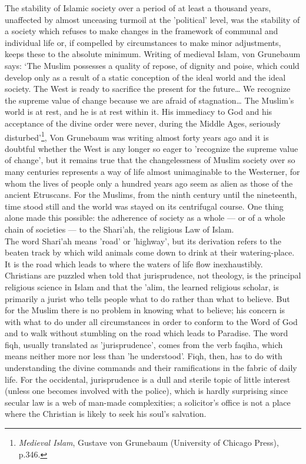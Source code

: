 \documentclass[10pt, twoside,openright]{book}
\begin{document}
The stability of Islamic society over a period of at least a thousand years, unaffected by almost 
unceasing turmoil at the 'political' level, was the stability of a society which refuses to make 
changes in the framework of communal and individual life or, if compelled by circumstances to make 
minor adjustments, keeps these to the absolute minimum. Writing of medieval Islam, von Grunebaum 
says: `The Muslim possesses a quality of repose, of dignity and poise, which could develop only as a 
result of a static conception of the ideal world and the ideal society. The West is ready to 
sacrifice the present for the future\ldots{} We recognize the supreme value of change because we are 
afraid of stagnation\ldots{} The Muslim's world is at rest, and he is at rest within it. His immediacy to 
God and his acceptance of the divine order were never, during the Middle Ages, seriously 
disturbed'\footnote{\emph{Medieval Islam}, Gustave von Grunebaum (University of Chicago Press), p.346.}, Von Grunebaum was writing almost forty years ago and it is doubtful whether the West 
is any longer so eager to 'recognize the supreme value of change', but it remains true that the 
changelessness of Muslim society over so many centuries represents a way of life almost unimaginable 
to the Westerner, for whom the lives of people only a hundred years ago seem as alien as those of the 
ancient Etruscans. For the Muslims, from the ninth century until the nineteenth, time stood still and 
the world was stayed on its centrifugal course. One thing alone made this possible: the adherence of 
society as a whole --- or of a whole chain of societies --- to the Shari'ah, the religious Law of Islam. \\

The word Shari'ah means 'road' or 'highway', but its derivation refers to the beaten track by which 
wild animals come down to drink at their watering\hyp{}place. It is the road which leads to where the 
waters of life flow inexhaustibly. \\

Christians are puzzled when told that jurisprudence, not theology, is the principal religious science 
in Islam and that the 'alim, the learned religious scholar, is primarily a jurist who tells people 
what to do rather than what to believe. But for the Muslim there is no problem in knowing what to 
believe; his concern is with what to do under all circumstances in order to conform to the Word of 
God and to walk without stumbling on the road which leads to Paradise. The word fiqh, usually 
translated as 'jurisprudence', comes from the verb faqiha, which means neither more nor less than 'he 
understood'. Fiqh, then, has to do with understanding the divine commands and their ramifications in 
the fabric of daily life. For the occidental, jurisprudence is a dull and sterile topic of little 
interest (unless one becomes involved with the police), which is hardly surprising since secular law 
is a web of man\hyp{}made complexities; a solicitor's office is not a place where the Christian is likely 
to seek his soul's salvation. \\
\end{document}
